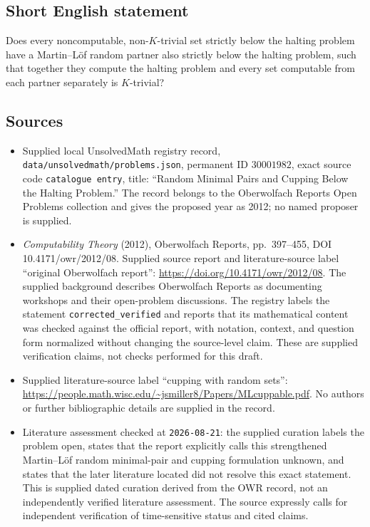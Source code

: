 \documentclass[11pt]{article}
\begin{document}
\subsection{Short English statement}
Does every noncomputable, non-\(K\)-trivial set strictly below the halting problem have a Martin--L\"of random partner also strictly below the halting problem, such that together they compute the halting problem and every set computable from each partner separately is \(K\)-trivial?
\subsection{Sources}
\begin{itemize}
\item Supplied local UnsolvedMath registry record, \texttt{data/unsolvedmath/problems.json}, permanent ID \(30001982\), exact source code \texttt{catalogue entry}, title: ``Random Minimal Pairs and Cupping Below the Halting Problem.'' The record belongs to the Oberwolfach Reports Open Problems collection and gives the proposed year as 2012; no named proposer is supplied.
\item \emph{Computability Theory} (2012), Oberwolfach Reports, pp.\ 397--455, DOI 10.4171/owr/2012/08. Supplied source report and literature-source label ``original Oberwolfach report'': \url{https://doi.org/10.4171/owr/2012/08}. The supplied background describes Oberwolfach Reports as documenting workshops and their open-problem discussions. The registry labels the statement \texttt{corrected\_verified} and reports that its mathematical content was checked against the official report, with notation, context, and question form normalized without changing the source-level claim. These are supplied verification claims, not checks performed for this draft.
\item Supplied literature-source label ``cupping with random sets'': \url{https://people.math.wisc.edu/~jsmiller8/Papers/MLcuppable.pdf}. No authors or further bibliographic details are supplied in the record.
\item Literature assessment checked at \texttt{2026-08-21}: the supplied curation labels the problem open, states that the report explicitly calls this strengthened Martin--L\"of random minimal-pair and cupping formulation unknown, and states that the later literature located did not resolve this exact statement. This is supplied dated curation derived from the OWR record, not an independently verified literature assessment. The source expressly calls for independent verification of time-sensitive status and cited claims.
\end{itemize}
\end{document}
